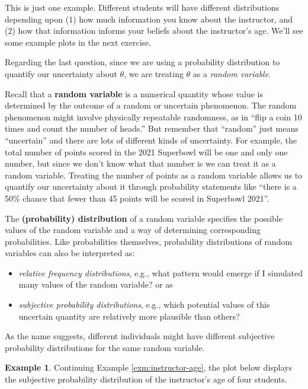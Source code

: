 \documentclass[
]{book}
\providecommand{\tightlist}{%
  \setlength{\itemsep}{0pt}\setlength{\parskip}{0pt}}
\theoremstyle{definition}
\theoremstyle{definition}
\newtheorem{example}{Example}[chapter]
\theoremstyle{definition}
\theoremstyle{remark}
\begin{document}
This is just one example. Different students will have different distributions depending upon (1) how much information you know about the instructor, and (2) how that information informs your beliefs about the instructor's age. We'll see some example plots in the next exercise.

Regarding the last question, since we are using a probability distribution to quantify our uncertainty about \(\theta\), we are treating \(\theta\) as a \emph{random variable}.

Recall that a \textbf{random variable} is a numerical quantity whose value is determined by the outcome of a random or uncertain phenomenon.
The random phenomenon might involve physically repeatable randomness, as in ``flip a coin 10 times and count the number of heads.'' But remember that ``random'' just means ``uncertain'' and there are lots of different kinds of uncertainty. For example, the total number of points scored in the 2021 Superbowl will be one and only one number, but since we don't know what that number is we can treat it as a random variable. Treating the number of points as a random variable allows us to quantify our uncertainty about it through probability statements like ``there is a 50\% chance that fewer than 45 points will be scored in Superbowl 2021''.

The \textbf{(probability) distribution} of a random variable specifies the possible values of the random variable and a way of determining corresponding probabilities. Like probabilities themselves, probability distributions of random variables can also be interpreted as:

\begin{itemize}
\tightlist
\item
  \emph{relative frequency distributions}, e.g., what pattern would emerge if I simulated many values of the random variable? or as
\item
  \emph{subjective probability distributions}, e.g., which potential values of this uncertain quantity are relatively more plausible than others?
\end{itemize}

As the name suggests, different individuals might have different subjective probability distributions for the same random variable.

\begin{example}
\protect\hypertarget{exm:instructor-age2}{}{\label{exm:instructor-age2} }
Continuing Example \ref{exm:instructor-age}, the plot below displays the subjective probability distribution of the instructor's age of four students.
\end{example}
\end{document}

